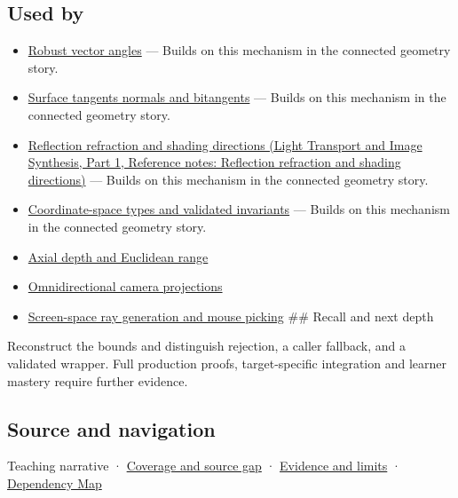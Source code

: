 \subsection{Used by}\label{appendix-f744e41b95b4-used-by}

\hypertarget{appendix-f744e41b95b4-used-by}{}

\begin{itemize}
\item
  \hyperref[appendix-e569e60e18e6]{Robust vector angles} --- Builds on this mechanism in the connected geometry story.
\item
  \hyperref[appendix-e31893dec985]{Surface tangents normals and bitangents} --- Builds on this mechanism in the connected geometry story.
\item
  \href{../04-Light-Transport-and-Image-Synthesis-P01/main.pdf\#appendix-44e00863b4d5}{Reflection refraction and shading directions (Light Transport and Image Synthesis, Part 1, Reference notes: Reflection refraction and shading directions)} --- Builds on this mechanism in the connected geometry story.
\item
  \hyperref[appendix-380a220e2529]{Coordinate-space types and validated invariants} --- Builds on this mechanism in the connected geometry story.
\item
  \hyperref[appendix-cac01ebeeb11]{Axial depth and Euclidean range}
\item
  \hyperref[appendix-fc99ad39f351]{Omnidirectional camera projections}
\item
  \hyperref[appendix-f1a6d43e80d1]{Screen-space ray generation and mouse picking} \#\# Recall and next depth
\end{itemize}

Reconstruct the bounds and distinguish rejection, a caller fallback, and a validated wrapper. Full production proofs, target-specific integration and learner mastery require further evidence.

\subsection{Source and navigation}\label{appendix-f744e41b95b4-source-and-navigation}

\hypertarget{appendix-f744e41b95b4-source-and-navigation}{}

{Teaching narrative} · \hyperref[appendix-fd090d982a15-phase-6---parts-501-600]{Coverage and source gap} · \hyperref[appendix-a103e7846d21-phase-6---source-analysis-and-verification]{Evidence and limits} · \hyperref[appendix-4ad47bdd269a]{Dependency Map}
